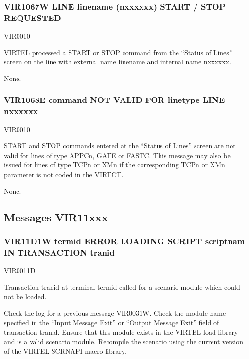 \documentclass[letterpaper,10pt,english]{sphinxmanual}
\begin{document}
\subsubsection{VIR1067W LINE linename (n\sphinxhyphen{}xxxxxx) START / STOP REQUESTED}
\label{\detokenize{messages:vir1067w-line-linename-n-xxxxxx-start-stop-requested}}\begin{description}
\sphinxAtStartPar
VIR0010

\sphinxAtStartPar
VIRTEL processed a START or STOP command from the “Status of Lines” screen on the line with external name linename and internal name n\sphinxhyphen{}xxxxxx.

\sphinxAtStartPar
None.

\end{description}


\subsubsection{VIR1068E command NOT VALID FOR linetype LINE n\sphinxhyphen{}xxxxxx}
\label{\detokenize{messages:vir1068e-command-not-valid-for-linetype-line-n-xxxxxx}}\begin{description}
\sphinxAtStartPar
VIR0010

\sphinxAtStartPar
START and STOP commands entered at the “Status of Lines” screen are not valid for lines of type APPCn, GATE or FASTC. This message may also be issued for lines of type TCPn or XMn if the corresponding TCPn or XMn parameter is not coded in the VIRTCT.

\sphinxAtStartPar
None.

\end{description}


\subsection{Messages VIR11xxx}
\label{\detokenize{messages:messages-vir11xxx}}

\subsubsection{VIR11D1W termid ERROR LOADING SCRIPT scriptnam IN TRANSACTION tranid}
\label{\detokenize{messages:vir11d1w-termid-error-loading-script-scriptnam-in-transaction-tranid}}\begin{description}
\sphinxAtStartPar
VIR0011D

\sphinxAtStartPar
Transaction tranid at terminal termid called for a scenario module which could not be loaded.

\sphinxAtStartPar
Check the log for a previous message VIR0031W. Check the module name specified in the “Input Message Exit” or “Output Message Exit” field of transaction tranid. Ensure that this module exists in the VIRTEL load library and is a valid scenario module. Recompile the scenario using the current version of the VIRTEL SCRNAPI macro library.

\end{description}
\end{document}

